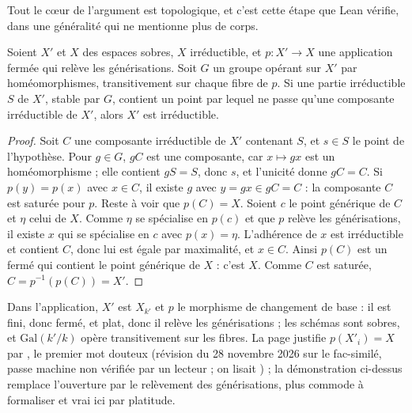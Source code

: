 Tout le cœur de l'argument est topologique, et c'est cette étape que Lean vérifie, dans une généralité qui ne mentionne plus de corps.

\begin{encadre}
\begin{enonce}
Soient $X'$ et $X$ des espaces sobres, $X$ irréductible, et $p : X' \to X$ une application fermée qui relève les générisations. Soit $G$ un groupe opérant sur $X'$ par homéomorphismes, transitivement sur chaque fibre de $p$. Si une partie irréductible $S$ de $X'$, stable par $G$, contient un point par lequel ne passe qu'une composante irréductible de $X'$, alors $X'$ est irréductible.
\end{enonce}
\end{encadre}

\begin{proof}
Soit $C$ une composante irréductible de $X'$ contenant $S$, et $s \in S$ le point de l'hypothèse. Pour $g \in G$, $gC$ est une composante, car $x \mapsto gx$ est un homéomorphisme ; elle contient $g S = S$, donc $s$, et l'unicité donne $gC = C$. Si $p(y) = p(x)$ avec $x \in C$, il existe $g$ avec $y = gx \in gC = C$ : la composante $C$ est saturée pour $p$. Reste à voir que $p(C) = X$. Soient $c$ le point générique de $C$ et $\eta$ celui de $X$. Comme $\eta$ se spécialise en $p(c)$ et que $p$ relève les générisations, il existe $x$ qui se spécialise en $c$ avec $p(x) = \eta$. L'adhérence de $x$ est irréductible et contient $C$, donc lui est égale par maximalité, et $x \in C$. Ainsi $p(C)$ est un fermé qui contient le point générique de $X$ : c'est $X$. Comme $C$ est saturée, $C = p^{-1}(p(C)) = X'$.
\end{proof}

Dans l'application, $X'$ est $X_{k'}$ et $p$ le morphisme de changement de base : il est fini, donc fermé, et plat, donc il relève les générisations ; les schémas sont sobres, et $\mathrm{Gal}(k'/k)$ opère transitivement sur les fibres. La page justifie $p(X'_i) = X$ par , le premier mot douteux (révision du 28 novembre 2026 sur le fac-similé, passe machine non vérifiée par un lecteur ; on lisait ) ; la démonstration ci-dessus remplace l'ouverture par le relèvement des générisations, plus commode à formaliser et vrai ici par platitude.

